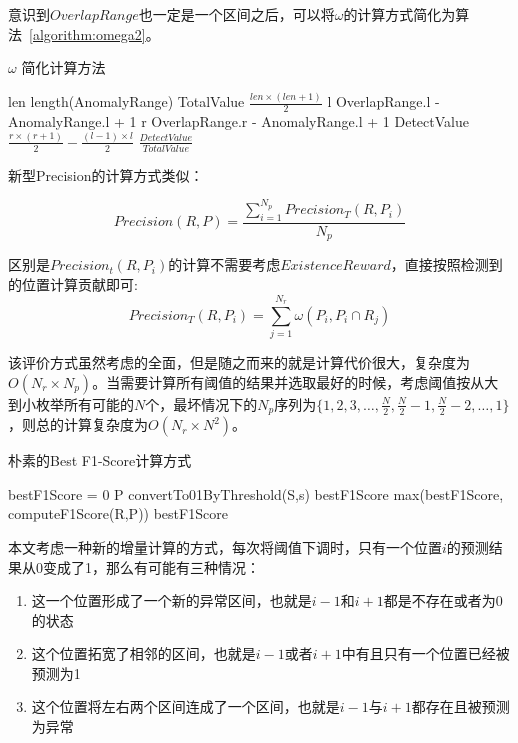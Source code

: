 意识到$OverlapRange$也一定是一个区间之后，可以将$\omega$的计算方式简化为算法~\ref{algorithm:omega2}。
  \begin{algorithm}
    \caption{$\omega$ 简化计算方法}
    \begin{algorithmic}[1]
        \State len \gets length(AnomalyRange)
        \State TotalValue \gets $\frac{len \times (len + 1)}{2}$
        \State l \gets OverlapRange.l - AnomalyRange.l + 1
        \State r \gets OverlapRange.r - AnomalyRange.l + 1
        \State DetectValue \gets $\frac{r \times (r+1)}{2} - \frac{(l-1) \times l}{2}$
        \State \Return $\frac{DetectValue}{TotalValue}$
        \EndFunction
    \end{algorithmic}
    \label{algorithm:omega2}
  \end{algorithm}

新型Precision的计算方式类似：

\begin{equation*}
Precision(R,P) = \frac{\sum\limits_{i=1}^{N_p}Precision_T(R,P_i)}{N_p}
\end{equation*}

区别是$Precision_t(R,P_i)$的计算不需要考虑$ExistenceReward$，直接按照检测到的位置计算贡献即可:
\begin{equation*}
Precision_T(R,P_i) = \sum_{j=1}^{N_r}\omega(P_i,P_i\cap R_j)
\end{equation*}

  该评价方式虽然考虑的全面，但是随之而来的就是计算代价很大，复杂度为$O(N_r\times N_p)$。当需要计算所有阈值的结果并选取最好的时候，考虑阈值按从大到小枚举所有可能的$N$个，最坏情况下的$N_p$序列为$\{1,2,3,\dots,\frac{N}{2},\frac{N}{2}-1,\frac{N}{2}-2,\dots,1\}$，则总的计算复杂度为$O(N_r\times N^2)$。

  \begin{algorithm}
  \caption{朴素的Best F1-Score计算方式}
  \begin{algorithmic}[1]
    \State bestF1Score = 0
    \State P \gets convertTo01ByThreshold(S,s)
    \State bestF1Score \gets max(bestF1Score, computeF1Score(R,P))
    \EndFor
    \State \Return bestF1Score
    \EndFunction
  \end{algorithmic}
  \end{algorithm}


  本文考虑一种新的增量计算的方式，每次将阈值下调时，只有一个位置$i$的预测结果从0变成了1，那么有可能有三种情况：
  \begin{enumerate}
    \item 这一个位置形成了一个新的异常区间，也就是$i-1$和$i+1$都是不存在或者为0的状态
    \item 这个位置拓宽了相邻的区间，也就是$i-1$或者$i+1$中有且只有一个位置已经被预测为1
    \item 这个位置将左右两个区间连成了一个区间，也就是$i-1$与$i+1$都存在且被预测为异常
  \end{enumerate}

